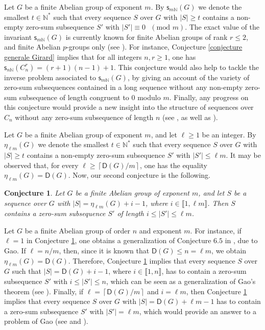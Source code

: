 \documentclass[english,12pt,a4paper,twoside]{smfart}
\theoremstyle{plain}
\newtheorem{conjecture}{Conjecture}
\theoremstyle{definition}
\theoremstyle{remark}
\begin{document}
\medskip
Let $G$ be a finite Abelian group of exponent $m$. By $\mathsf{s}_{m\mathbb{N}}(G)$ we denote the smallest $t \in \mathbb{N}^*$ such that every sequence $S$ over $G$ with $|S| \geq t$ contains a non-empty zero-sum subsequence $S'$ with $\left|S'\right| \equiv 0 \text{ } (\text{mod } m).$ The exact value of the invariant $\mathsf{s}_{m\mathbb{N}}(G)$ is currently known for finite Abelian groups of rank $r \leq 2$, and finite Abelian $p$-groups only (see \cite[Theorem $6.7$]{GaoGero06}). For instance, Conjecture \ref{conjecture generale Girard} implies that for all integers $n,r \geq 1$, one has $\mathsf{s}_{n\mathbb{N}}(C^r_n)=(r+1)(n-1)+1$. This conjecture would also help to tackle the inverse problem associated to $\mathsf{s}_{m\mathbb{N}}(G)$, by giving an account of the variety of zero-sum subsequences contained in a long sequence without any non-empty zero-sum subsequence of length congruent to $0$ modulo $m$. Finally, any progress on this conjecture would provide a new insight into the structure of sequences over $C_n$ without any zero-sum subsequence of length $n$ (see \cite[Theorem $7.5$ and Conjecture $7.6$]{GaoGero06}, as well as \cite{SavChen07}).

\medskip
Let $G$ be a finite Abelian group of exponent $m$, and let $\ell \geq 1$ be an integer. By $\eta_{\ell m}(G)$ we denote the smallest $t \in \mathbb{N}^*$ such that every sequence $S$ over $G$ with $|S| \geq t$ contains a non-empty zero-sum subsequence $S'$ with $\left|S'\right| \leq \ell m$. It may be observed that, for every $\ell \geq \left\lceil \mathsf{D}(G)/m\right\rceil$, one has the equality $\eta_{\ell m}(G)=\mathsf{D}(G)$. Now, our second conjecture is the following.

\begin{conjecture}
\label{conjecture eta}
Let $G$ be a finite Abelian group of exponent $m$, and let $S$ be a sequence over $G$ with $\left|S\right|=\eta_{\ell m}(G)+i-1$, where $i \in \llbracket 1,\ell m \rrbracket$. Then $S$ contains a zero-sum subsequence $S'$ of length $i \leq \left|S'\right| \leq \ell m$. 
\end{conjecture}

\medskip
Let $G$ be a finite Abelian group of order $n$ and exponent $m$. For instance, if $\ell=1$ in Conjecture \ref{conjecture eta}, one obtains a generalization of Conjecture $6.5$ in \cite{GaoGero06}, due to Gao. If $\ell=n/m$, then, since it is known that $\mathsf{D}(G) \leq n=\ell m$, we obtain $\eta_{\ell m}(G)=\mathsf{D}(G)$. Therefore, Conjecture \ref{conjecture eta} implies that every sequence $S$ over $G$ such that $\left|S\right|=\mathsf{D}(G)+i-1$, where $i \in \llbracket 1,n \rrbracket$, has to contain a zero-sum subsequence $S'$ with $i \leq \left|S'\right| \leq n$, which can be seen as a generalization of Gao's theorem (see \cite[Theorem $1$]{Gao96}). Finally, if $\ell=\left\lceil \mathsf{D}(G)/m\right\rceil$ and $i = \ell m$, then Conjecture \ref{conjecture eta} implies that every sequence $S$ over $G$ with $\left|S\right|=\mathsf{D}(G)+ \ell m - 1$ has to contain a zero-sum subsequence $S'$ with $\left|S'\right| = \ell m$, which would provide an answer to a problem of Gao (see \cite[Section $3$]{Gao03} and \cite[Theorem $6.12$]{GaoGero06}).  
\end{document}
